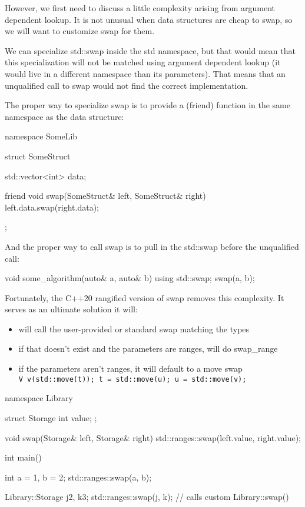 However, we first need to discuss a little complexity arising from argument dependent lookup. It is not unusual when data structures are cheap to swap, so we will want to customize swap for them.

We can specialize std::swap inside the std namespace, but that would mean that this specialization will not be matched using argument dependent lookup (it would live in a different namespace than its parameters). That means that an unqualified call to swap would not find the correct implementation.

The proper way to specialize swap is to provide a (friend) function in the same namespace as the data structure:

\begin{box-note}
\begin{cppcode}
namespace SomeLib {

struct SomeStruct {
    std::vector<int> data;

    friend void swap(SomeStruct& left, SomeStruct& right) {
        left.data.swap(right.data);
    }
};

}
\end{cppcode}
\end{box-note}

And the proper way to call swap is to pull in the std::swap before the unqualified call:

\begin{box-note}
\begin{cppcode}
void some_algorithm(auto& a, auto& b) {
    using std::swap;
    swap(a, b);
}
\end{cppcode}
\end{box-note}

Fortunately, the C++20 rangified version of swap removes this complexity. It serves as an ultimate solution it will:

\begin{itemize}
    \item will call the user-provided or standard swap matching the types
    \item if that doesn’t exist and the parameters are ranges, will do swap\_range
    \item if the parameters aren’t ranges, it will default to a move swap\\
    \texttt{V v(std::move(t)); t = std::move(u); u = std::move(v);}
\end{itemize}

\begin{box-note}
\begin{cppcode}
namespace Library {
struct Storage {
    int value;
};

void swap(Storage& left, Storage& right) {
    std::ranges::swap(left.value, right.value);
}
}

int main() {
    int a = 1, b = 2;
    std::ranges::swap(a, b);

    Library::Storage j{2}, k{3};
    std::ranges::swap(j, k); // calls custom Library::swap()
}
\end{cppcode}
\end{box-note}

